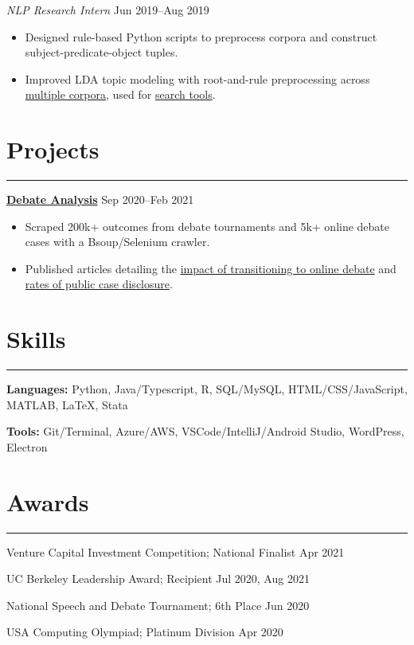 \documentclass[11pt]{article}
\newcommand{\resumesection}[1]{\vspace{-0.8cm}\section*{\color{highlight}#1}\vspace{-0.3cm}\hrule\vspace{0.2cm}}
\begin{document}
\textit{NLP Research Intern} \hfill Jun 2019--Aug 2019
\begin{itemize}
	\item Designed rule-based Python scripts to preprocess corpora and construct subject-predicate-object tuples.
	\item Improved LDA topic modeling with root-and-rule preprocessing across \href{https://github.com/petezh/RR-NLP-Tools}{multiple corpora}, used for \href{https://randr.nist.gov/mgi/Default.aspx}{search tools}.
\end{itemize}\par

\resumesection{Projects}

\textbf{\href{https://github.com/petezh/E-Debate}{Debate Analysis}} \hfill Sep 2020--Feb 2021\par
\begin{itemize}
	\item Scraped 200k+ outcomes from debate tournaments and 5k+ online debate cases with a Bsoup/Selenium crawler.
	\item Published articles detailing the \href{https://www.vbriefly.com/2020/12/31/five-trends-among-e-debate-competitors-by-peter-zhang/}{impact of transitioning to online debate} and \href{https://www.vbriefly.com/2021/01/22/disclosure-in-numbers-by-peter-zhang/}{rates of public case disclosure}.
\end{itemize}\vspace{0.1cm} \par

\resumesection{Skills}

\textbf{Languages:} Python, Java/Typescript, R, SQL/MySQL, HTML/CSS/JavaScript, MATLAB, \LaTeX, Stata \par
\textbf{Tools:} Git/Terminal, Azure/AWS, VSCode/IntelliJ/Android Studio, WordPress, Electron

\resumesection{Awards}

Venture Capital Investment Competition; National Finalist \hfill Apr 2021\par
UC Berkeley Leadership Award; Recipient \hfill Jul 2020, Aug 2021 \par
National Speech and Debate Tournament; 6th Place \hfill Jun 2020 \par
USA Computing Olympiad; Platinum Division \hfill Apr 2020 \par
\end{document}
